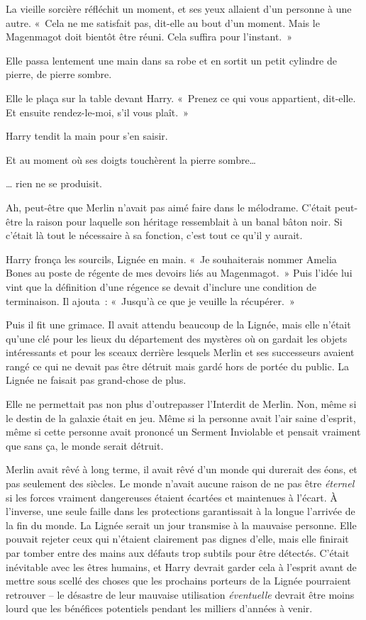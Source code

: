 La vieille sorcière réfléchit un moment, et ses yeux allaient d'un personne à une autre. «~Cela ne me satisfait pas, dit-elle au bout d'un moment. Mais le Magenmagot doit bientôt être réuni. Cela suffira pour l'instant.~»

Elle passa lentement une main dans sa robe et en sortit un petit cylindre de pierre, de pierre sombre.

Elle le plaça sur la table devant Harry. «~Prenez ce qui vous appartient, dit-elle. Et ensuite rendez-le-moi, s'il vous plaît.~»

Harry tendit la main pour s'en saisir.

Et au moment où ses doigts touchèrent la pierre sombre…

… rien ne se produisit.

Ah, peut-être que Merlin n'avait pas aimé faire dans le mélodrame. C'était peut-être la raison pour laquelle son héritage ressemblait à un banal bâton noir. Si c'était là tout le nécessaire à sa fonction, c'est tout ce qu'il y aurait.

Harry fronça les sourcils, Lignée en main. «~Je souhaiterais nommer Amelia Bones au poste de régente de mes devoirs liés au Magenmagot.~» Puis l'idée lui vint que la définition d'une régence se devait d'inclure une condition de terminaison. Il ajouta~: «~Jusqu'à ce que je veuille la récupérer.~»

Puis il fit une grimace. Il avait attendu beaucoup de la Lignée, mais elle n'était qu'une clé pour les lieux du département des mystères où on gardait les objets intéressants et pour les sceaux derrière lesquels Merlin et ses successeurs avaient rangé ce qui ne devait pas être détruit mais gardé hors de portée du public. La Lignée ne faisait pas grand-chose de plus.

Elle ne permettait pas non plus d'outrepasser l'Interdit de Merlin. Non, même si le destin de la galaxie était en jeu. Même si la personne avait l'air saine d'esprit, même si cette personne avait prononcé un Serment Inviolable et pensait vraiment que sans ça, le monde serait détruit.

Merlin avait rêvé à long terme, il avait rêvé d'un monde qui durerait des éons, et pas seulement des siècles. Le monde n'avait aucune raison de ne pas être \emph{éternel} si les forces vraiment dangereuses étaient écartées et maintenues à l'écart. À l'inverse, une seule faille dans les protections garantissait à la longue l'arrivée de la fin du monde. La Lignée serait un jour transmise à la mauvaise personne. Elle pouvait rejeter ceux qui n'étaient clairement pas dignes d'elle, mais elle finirait par tomber entre des mains aux défauts trop subtils pour être détectés. C'était inévitable avec les êtres humains, et Harry devrait garder cela à l'esprit avant de mettre sous scellé des choses que les prochains porteurs de la Lignée pourraient retrouver -- le désastre de leur mauvaise utilisation \emph{éventuelle} devrait être moins lourd que les bénéfices potentiels pendant les milliers d'années à venir.

